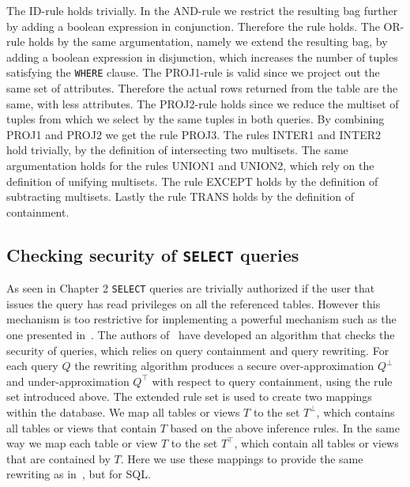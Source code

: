 
The ID-rule holds trivially.
%
In the AND-rule we restrict the resulting bag further by adding a boolean expression in conjunction. 
%
Therefore the rule holds.
%
The OR-rule holds by the same argumentation, namely we extend the resulting bag, by adding a boolean expression in disjunction,  which increases the number of tuples satisfying the \texttt{WHERE} clause. 
%
The PROJ1-rule is valid since we project out the same set of attributes. Therefore the actual rows returned from the table are the same, with less attributes.
%
%
The PROJ2-rule holds since we reduce the multiset of tuples from which we select by the same tuples in both queries.
%
By combining PROJ1 and PROJ2 we get the rule PROJ3.
%
The rules INTER1 and INTER2 hold trivially, by the definition of intersecting two multisets.
%
The same argumentation holds for the rules UNION1 and UNION2, which rely on the definition of unifying multisets.
%
The rule EXCEPT holds by the definition of subtracting multisets.
%
Lastly the rule TRANS holds by the definition of containment.

\FloatBarrier
\subsection{Checking security of \texttt{SELECT} queries}

As seen in Chapter 2 \texttt{SELECT} queries are trivially authorized  if the user that issues the query has read privileges on all the referenced tables.
%
However this mechanism is too restrictive for implementing a powerful mechanism such as the one presented in~\cite{guarnieri2016strong}.
%
The authors of~\cite{guarnieri2016strong} have developed an algorithm that checks the security of queries, which relies on query containment and query rewriting. 
%
For each query $Q$ the rewriting algorithm produces a secure over-approximation $Q^\bot$ and under-approximation $Q^\top$ with respect to query containment, using the rule set introduced above. 
%
%
The extended rule set is used to create two mappings within the database.
%
We map all tables or views $T$ to the set $T^\bot$, which contains all tables or views that contain $T$ based on the above inference rules.
%
In the same way we map each table or view $T$ to the set $T^\top$, which contain all tables or views that are contained by $T$.
%
Here we use these mappings to provide the same rewriting as in~\cite{guarnieri2016strong}, but for SQL.

